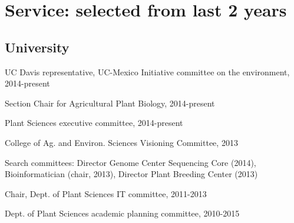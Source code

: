 \documentclass[letterpaper]{article}
\renewenvironment{itemize}{
  \begin{list}{}{
    \setlength{\leftmargin}{1.5em}
  }
}{
  \end{list}
}
\begin{document}
\section*{Service: selected from last 2 years}
\begin{itemize}
\subsection*{University}
\item UC Davis representative, UC-Mexico Initiative committee on the environment, 2014-present 
\item Section Chair for Agricultural Plant Biology, 2014-present
\item Plant Sciences executive committee, 2014-present
\item College of Ag. and Environ. Sciences Visioning Committee, 2013
\item Search committees: Director Genome Center Sequencing Core (2014), Bioinformatician (chair, 2013), Director Plant Breeding Center (2013)
\item Chair, Dept. of Plant Sciences IT committee, 2011-2013
\item Dept. of Plant Sciences academic planning committee, 2010-2015


\end{itemize}
\end{document}
